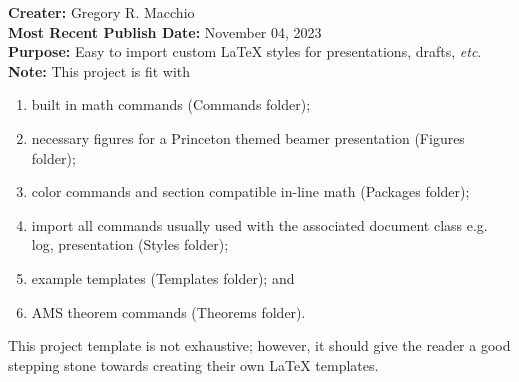 \documentclass{article}
\begin{document}
    \noindent \textbf{Creater:} Gregory R. Macchio \\
    \textbf{Most Recent Publish Date:} November 04, 2023 \\
    \noindent \textbf{Purpose:} Easy to import custom LaTeX styles for presentations, drafts, \textit{etc}. \\
    \noindent \textbf{Note:}
    This project is fit with 
    \begin{enumerate}
        \item built in math commands (Commands folder);
        \item necessary figures for a Princeton themed beamer presentation (Figures folder);
        \item color commands and section compatible in-line math (Packages folder);
        \item import all commands usually used with the associated document class e.g. log, presentation (Styles folder);
        \item example templates (Templates folder); and
        \item AMS theorem commands (Theorems folder).
    \end{enumerate}
    \noindent This project template is not exhaustive; however, it should give the reader a good stepping stone towards creating their own LaTeX templates.
\end{document}
